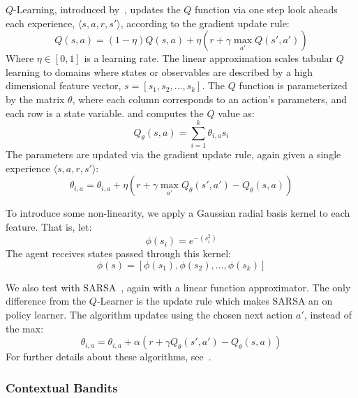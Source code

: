 \documentclass{article}
\begin{document}
{$Q$-Learning, introduced by~\citet{watkins1992q}, updates the $Q$ function via one step look aheads each experience, $\langle s, a, r, s' \rangle$, according to the gradient update rule:
\begin{equation}
Q(s,a) = (1-\eta) Q(s,a) + \eta(r + \gamma \max_{a'} Q(s', a'))
\end{equation}
Where $\eta \in [0,1]$ is a learning rate. The linear approximation scales tabular $Q$ learning to domains where states or observables are described by a high dimensional feature vector, $s = [s_1, s_2, \ldots, s_k]$. The $Q$ function is parameterized by the matrix $\theta$, where each column corresponds to an action's parameters, and each row is a state variable. and computes the $Q$ value as:
\begin{equation}
Q_\theta(s,a) = \sum_{i=1}^k \theta_{i,a} s_i
\end{equation}
The parameters are updated via the gradient update rule, again given a single experience $\langle s, a, r, s' \rangle$:
\begin{equation}
\theta_{i,a} = \theta_{i,a} + \eta \left( r + \gamma \max_{a'} Q_\theta(s',a') - Q_\theta(s,a)\right)
\end{equation}

To introduce some non-linearity, we apply a Gaussian radial basis kernel to each feature. That is, let:
\begin{equation}
\phi(s_i) = e^{-(s_i^2)}
\end{equation}
The agent receives states passed through this kernel:
\begin{equation}
\phi(s) = [\phi(s_1), \phi(s_2), \ldots, \phi(s_k)]
\end{equation}

We also test with SARSA~\cite{rummery1994line}, again with a linear function approximator. The only difference from the $Q$-Learner is the update rule which makes SARSA an on policy learner. The algorithm updates using the chosen next action $a'$, instead of the max:
\begin{equation}
\theta_{i,a} = \theta_{i,a} + \alpha \left( r + \gamma Q_\theta(s',a') - Q_\theta(s,a)\right)
\end{equation}
For further details about these algorithms, see~\citet{geramifard2013tutorial}.

\subsubsection{Contextual Bandits}

}
\end{document}
